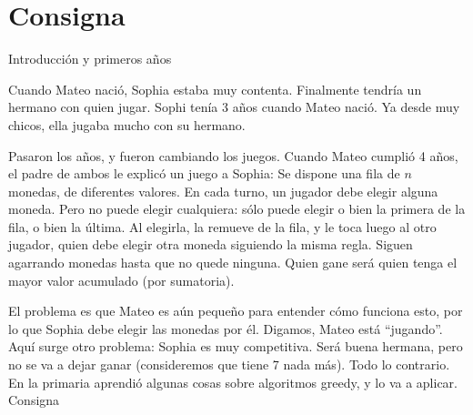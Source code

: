 \section*{Consigna}


{\Large Introducción y primeros años}
\vskip0.5cm

Cuando Mateo nació, Sophia estaba muy contenta. Finalmente tendría un hermano con quien jugar. Sophi tenía 3 años cuando Mateo nació. Ya desde muy chicos, ella jugaba mucho con su hermano.

Pasaron los años, y fueron cambiando los juegos. Cuando Mateo cumplió 4 años, el padre de ambos le explicó un juego a Sophia: Se dispone una fila de $n$ monedas, de diferentes valores. En cada turno, un jugador debe elegir alguna moneda. Pero no puede elegir cualquiera: sólo puede elegir o bien la primera de la fila, o bien la última. Al elegirla, la remueve de la fila, y le toca luego al otro jugador, quien debe elegir otra moneda siguiendo la misma regla. Siguen agarrando monedas hasta que no quede ninguna. Quien gane será quien tenga el mayor valor acumulado (por sumatoria).

El problema es que Mateo es aún pequeño para entender cómo funciona esto, por lo que Sophia debe elegir las monedas por él. Digamos, Mateo está “jugando”. Aquí surge otro problema: Sophia es muy competitiva. Será buena hermana, pero no se va a dejar ganar (consideremos que tiene 7 nada más). Todo lo contrario. En la primaria aprendió algunas cosas sobre algoritmos greedy, y lo va a aplicar.
\vskip0.5cm
{\Large Consigna}
\vskip0.5cm

